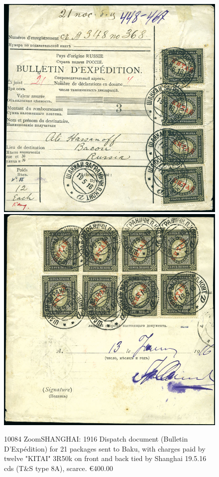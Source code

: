 \begin{figure}[htbp]
\centering
\includegraphics[width=.95\textwidth]{../russian-post-offices-in-china/10084.jpg}
\includegraphics[width=.95\textwidth]{../russian-post-offices-in-china/10084-1.jpg}
\caption{
10084		ZoomSHANGHAI: 1916 Dispatch document (Bulletin D'Exp\'edition) for 
21 packages sent to Baku, with charges paid by twelve "KITAI" 3R50k on 
front and back tied by Shanghai 19.5.16 cds (T\&S type 8A), scarce.
\euro 400.00  
}  
\end{figure} 



